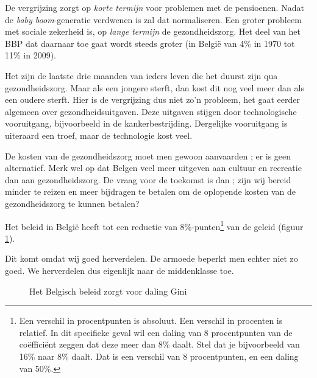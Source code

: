 De vergrijzing zorgt op \textit{korte termijn} voor problemen met de pensioenen. Nadat de \textit{baby boom}-generatie verdwenen is zal dat normaliseren. Een groter probleem met sociale zekerheid is, op \textit{lange termijn} de gezondheidszorg. Het deel van het BBP dat daarnaar toe gaat wordt steeds groter (in Belgi\"e van 4\% in 1970 tot 11\% in 2009).\\

\par Het zijn de laatste drie maanden van ieders leven die het duurst zijn qua gezondheidszorg. Maar als een jongere sterft, dan kost dit nog veel meer dan als een oudere sterft. Hier is de vergrijzing dus niet zo'n probleem, het gaat eerder algemeen over gezondheidsuitgaven. Deze uitgaven stijgen door technologische vooruitgang, bijvoorbeeld in de kankerbestrijding. Dergelijke vooruitgang is uiteraard een troef, maar de technologie kost veel.
\par De kosten van de gezondheidszorg moet men gewoon aanvaarden ; er is geen alternatief. Merk wel op dat Belgen veel meer uitgeven aan cultuur en recreatie dan aan gezondheidszorg. De vraag voor de toekomst is dan ; zijn wij bereid minder te reizen en meer bijdragen te betalen om de oplopende kosten van de gezondheidszorg te kunnen betalen?\\

\par Het beleid in Belgi\"e heeft tot een reductie van 8\%-punten\footnote{Een verschil in procentpunten is absoluut. Een verschil in procenten is relatief. In dit specifieke geval wil een daling van 8 procentpunten van de co\"effici\"ent zeggen dat deze meer dan 8\% daalt. Stel dat je bijvoorbeeld van 16\% naar 8\% daalt. Dat is een verschil van 8 procentpunten, en een daling van 50\%.} van de  geleid (figuur \ref{fig:h4ginibeleid}).
\par Dit komt omdat wij goed herverdelen. De armoede beperkt men echter niet zo goed. We herverdelen dus eigenlijk naar de middenklasse toe.

\edef\numberofrows{\pgfplotsretval}
\begin{figure}[H]
\small\centering
\captionsetup{justification=centering,margin=2cm}
\caption{Het Belgisch beleid zorgt voor daling Gini}
\label{fig:h4ginibeleid}
\end{figure}

